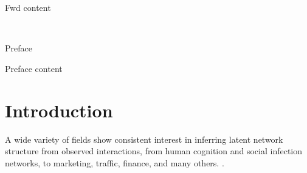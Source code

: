 \documentclass[%
	12pt,
		oneside,
		letterpaper
]{book}
\renewcommand{\contentsname}%
    {Table of contents}%
\renewcommand*\contentsname{Table of contents}
\newcommand\contentsname{Table of contents}
\begin{document}
\vspace{1ex}

Fwd content
\clearpage
{} %
\small\normalsize
\hbox{\ }
 
\vspace{.5in}

\begin{center}
\large{Preface} 
\end{center} 

\vspace{1ex}

Preface content

\cleardoublepage


    \renewcommand{\contentsname}{Table of Contents}
\renewcommand{\baselinestretch}{1}
\small\normalsize
\tableofcontents %
\newpage

    \renewcommand{\contentsname}{List of Tables}
\listoftables %
\newpage

    \renewcommand{\contentsname}{List of Figures}
\listoffigures %
\newpage

% 

\newpage
\setlength{\parskip}{0em}
\renewcommand{\baselinestretch}{2}
\small\normalsize



\chapter{Introduction}\label{sec-intro}

A wide variety of fields show consistent interest in inferring latent
network structure from observed interactions, from human cognition and
social infection networks, to marketing, traffic, finance, and many
others.
\autocite{Inferringnetworksdiffusion_GomezRodriguez2012,ReconstructingNetworksUnknown_Peixoto2018}.
\end{document}
